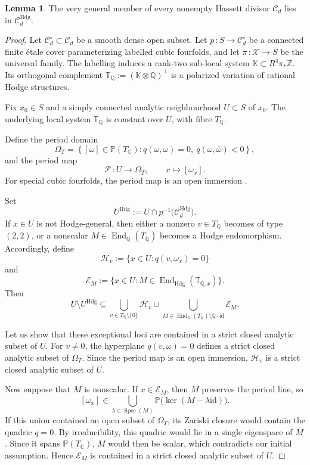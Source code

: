 \documentclass[10pt]{amsart}
\numberwithin{equation}{section}
\theoremstyle{definition}
\newtheorem{lemma}[theorem]{Lemma}
\theoremstyle{plain}
\numberwithin{theorem}{section}
\def\PP{{\mathbb{P}}}
\def\ZZ{{\mathbb{Z}}}
\newcommand{\Q}{\mathbb{Q}}
\newcommand{\C}{\mathbb{C}}
\newcommand{\id}{\mathrm{id}}
\newcommand{\End}{\operatorname{End}}
\begin{document}
\begin{lemma}\label{lem:generic}
The very general member of every nonempty Hassett divisor $\mathcal{C}_d$ lies in $\mathcal{C}_d^{\mathrm{Hdg}}$.
\end{lemma}
\begin{proof} 

Let $\mathcal C_d^\circ\subset\mathcal C_d$ be a smooth dense open
subset. Let
$p\,\colon S\longrightarrow\mathcal C_d^\circ$ 
be a connected finite \'etale cover parameterizing labelled cubic fourfolds, and let $\pi\,\colon\mathcal X\to S$ be the universal family. The labelling induces a rank-two sub-local system
$\mathbb K\subset R^4\pi_*\ZZ$. Its orthogonal complement $\mathbb T_{\Q}:=(\mathbb K\otimes\Q)^\perp$ is a polarized variation of rational Hodge structures.


Fix $x_0 \in S$ and a simply connected analytic neighbourhood $U\subset S$ of $x_0$. The underlying local system $\mathbb T_{\Q}$ is constant over $U$, with fibre $T_{\Q}$.

Define the period domain
\[
\Omega_T=
\left\{
[\omega]\in\PP(T_{\C}) :
q(\omega,\omega)=0,\ 
q(\omega,\overline{\omega})<0
\right\},
\] 
and the period map
\[
\mathcal P\,\colon U\longrightarrow\Omega_T,
\qquad
x\longmapsto[\omega_x].
\]
For special cubic fourfolds, the period map is an open immersion
\cite[Theorem~2.2.1]{hassett}. 

Set
$$
U^{\mathrm{Hdg}}
:=
U\cap p^{-1}\bigl(\mathcal C_d^{\mathrm{Hdg}}\bigr).
$$
If $x\in U$ is not Hodge-general, then either a nonzero
$v\in T_{\Q}$ becomes of type $(2,2)$, or a nonscalar
$M\in\End_{\Q}(T_{\Q})$ becomes a Hodge endomorphism. Accordingly,
define
$$
\mathcal H_v
:=
\{x\in U:q(v,\omega_x)=0\}
$$
and
$$
\mathcal E_M
:=
\{x\in U:M\in\End_{\mathrm{Hdg}}(\mathbb T_{\Q,x})\}.
$$
Then
$$
U\setminus U^{\mathrm{Hdg}}
\subseteq
\bigcup_{v\in T_{\Q}\setminus\{0\}}\mathcal H_v
\cup
\bigcup_{M\in\End_{\Q}(T_{\Q})\setminus\Q\cdot\id}
\mathcal E_M.
$$

Let us show that these exceptional loci are contained in a strict closed analytic subset of $U$. For $v\neq0$, the hyperplane $q(v,\omega)=0$ defines a strict closed analytic subset of $\Omega_T$. Since the period map is an open immersion, $\mathcal H_v$ is a strict closed analytic subset of $U$.

Now suppose that $M$ is nonscalar. If $x\in\mathcal E_M$, then $M$ preserves the period line, so
$$
[\omega_x]\in
\bigcup_{\lambda\in\operatorname{Spec}(M)}
\PP\bigl(\ker(M-\lambda\id)\bigr).
$$
If this union contained an open subset of $\Omega_T$, its Zariski closure would contain the quadric $q=0$. By irreducibility, this quadric would lie in a single eigenspace of $M$. Since it spans $\PP(T_{\C})$, $M$ would then be scalar, which contradicts our initial assumption. Hence $\mathcal E_M$ is contained in a strict closed analytic subset of $U$.


\end{proof}
\end{document}
